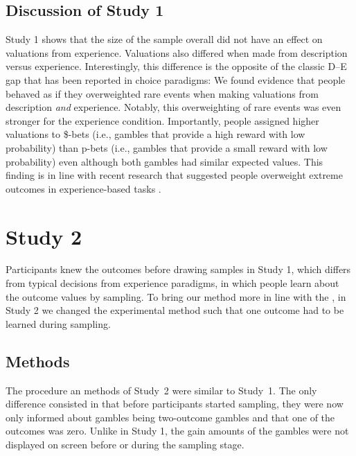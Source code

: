 \documentclass[a4paper, man, natbib, floatsintext]{apa6}
\begin{document}

\clearpage

\subsection{Discussion of Study 1}

Study 1 shows that the size of the sample overall did not have an effect on valuations from experience.  Valuations also differed when made from description versus experience. Interestingly, this difference is the opposite of the classic D--E gap that has been reported in choice paradigms: We found evidence that people behaved as if they overweighted rare events when making valuations from description \textit{and} experience. Notably, this overweighting of rare events was even stronger for the experience condition. Importantly, people assigned higher valuations to \$-bets (i.e., gambles that provide a high reward with low probability) than p-bets (i.e., gambles that provide a small reward with low probability) even although both gambles had similar expected values. This finding is in line with recent research that suggested people overweight extreme outcomes in experience-based tasks \citep{Ludvig2017}.

\section{Study 2}
Participants knew the outcomes before drawing samples in Study 1, which differs from typical decisions from experience paradigms, in which people learn about the outcome values by sampling. To bring our method more in line with the , in Study 2 we changed the experimental method such that one outcome had to be learned during sampling.

\subsection{Methods}
The procedure an methods of Study~2 were similar to Study~1. The only difference consisted in that before participants started sampling, they were now only informed about gambles being two-outcome gambles and that one of the outcomes was zero. Unlike in Study 1, the gain amounts of the gambles were not displayed on screen before or during the sampling stage.
\end{document}
